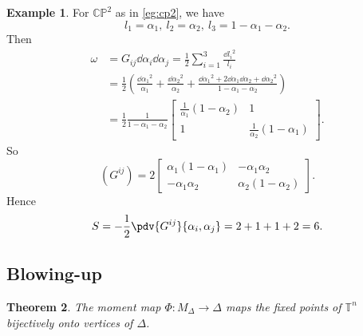 \documentclass[12pt]{article}
\theoremstyle{plain}\newtheorem{theorem}{Theorem}
\theoremstyle{definition}\newtheorem{definition}[theorem]{Definition}
\theoremstyle{definition}\newtheorem{example}[theorem]{Example}
\theoremstyle{plain}\newtheorem{axiom}[theorem]{Axiom}
\theoremstyle{plain}\newtheorem{assertion}[theorem]{Assertion}
\theoremstyle{plain}\newtheorem{corollary}[theorem]{Corollary}
\theoremstyle{plain}\newtheorem{lemma}[theorem]{Lemma}
\theoremstyle{plain}\newtheorem{proposition}[theorem]{Proposition}
\theoremstyle{plain}\newtheorem{prop}[theorem]{Proposition}
\theoremstyle{plain}\newtheorem{conjecture}[theorem]{Conjecture}
\theoremstyle{plain}\newtheorem{conj}[theorem]{Conjecture}
\theoremstyle{plain}\newtheorem{problem}[theorem]{Problem}
\theoremstyle{remark}\newtheorem{notation}[theorem]{Notation}
\theoremstyle{definition}\newtheorem*{question}{Question}
\theoremstyle{definition}\newtheorem*{answer}{Answer}
\theoremstyle{definition}\newtheorem*{goal}{Goal}
\theoremstyle{plain}\newtheorem*{application}{Application}
\theoremstyle{plain}\newtheorem*{exercise}{Exercise}
\theoremstyle{remark}\newtheorem*{remark}{Remark}
\theoremstyle{remark}\newtheorem*{note}{\small{Note}}
\numberwithin{equation}{section}
\numberwithin{theorem}{section}
\numberwithin{figure}{section}
\begin{document}
\begin{example}
    For \(\mathbb{CP}^2\) as in \cref{eg:cp2}, we have \[
        l_1=\alpha_1,\ l_2=\alpha_2,\ l_3=1-\alpha_1-\alpha_2
    .\] Then
    \begin{align*}
        \omega&=G_{ij}\dd{\alpha_i}\dd{\alpha_j}
        =\frac{1}{2}\sum_{i=1}^3 \frac{\dd{l_i}^2}{l_i} \\
        &=\frac{1}{2}\left(\frac{\dd{\alpha_1}^2}{\alpha_1}
        +\frac{\dd{\alpha_2}^2}{\alpha_2}
        +\frac{\dd{\alpha_1}^2+2\dd{\alpha_1}\dd{\alpha_2}+\dd{\alpha_2}^2}
        {1-\alpha_1-\alpha_2}\right) \\
        &=\frac{1}{2}\frac{1}{1-\alpha_1-\alpha_2}\begin{bmatrix}
            \frac{1}{\alpha_1}(1-\alpha_2) & 1 \\
            1 & \frac{1}{\alpha_2}(1-\alpha_1)
        \end{bmatrix}
    .\end{align*} So \[
        (G^{ij})=2\begin{bmatrix}
            \alpha_1(1-\alpha_1) & -\alpha_1\alpha_2 \\
            -\alpha_1\alpha_2 & \alpha_2(1-\alpha_2)
        \end{bmatrix}
    .\] Hence \[
        S=-\frac{1}{2}\pdv{G^{ij}}{\alpha_i,\alpha_j}
        =2+1+1+2=6
    .\] 
\end{example}

\subsection{Blowing-up}\label{sec:blowing-up}

\begin{theorem}
    The moment map \(\Phi\colon M_\Delta\to \Delta\) maps the fixed points of
    \(\mathbb{T}^n\) bijectively onto vertices of \(\Delta\).
\end{theorem}
\end{document}
